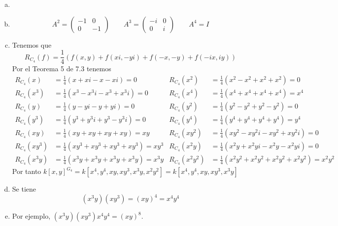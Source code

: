 \documentclass[twoside]{article}
\begin{document}
\begin{solucion}
\begin{enumerate}[a.]
\item[]
\item
\[
A^2=\begin{pmatrix}
-1 & 0\\
0 & -1
\end{pmatrix} \qquad A^3=\begin{pmatrix}
-i & 0\\
0 & i
\end{pmatrix} \qquad A^4=I
\]
\item Tenemos que
$$
R_{C_4}(f)=\frac{1}{4}(f(x,y)+f(xi,-yi)+f(-x,-y)+f(-ix,iy))
$$
Por el Teorema 5 de 7.3 tenemos
\begin{align*}
R_{C_4}(x)&=\frac{1}{4}(x+xi-x-xi) = 0  & 
R_{C_4}(x^2)&=\frac{1}{4}(x^2-x^2+x^2+x^2) = 0\\
R_{C_4}(x^3) &=\frac{1}{4}(x^3-x^3i-x^3+x^3i)=0 &
R_{C_4}(x^4) &=\frac{1}{4}(x^4+x^4+x^4+x^4)=x^4\\
R_{C_4}(y)&=\frac{1}{4}(y-yi-y+yi) = 0 &
R_{C_4}(y^2)&=\frac{1}{4}(y^2-y^2+y^2-y^2) = 0\\
R_{C_4}(y^3) &=\frac{1}{4}(y^3+y^3i+y^3-y^3i)=0&
R_{C_4}(y^4) &=\frac{1}{4}(y^4+y^4+y^4+y^4)=y^4\\
R_{C_4}(xy)&=\frac{1}{4}(xy+xy+xy +xy) = xy & 
R_{C_4}(xy^2)&=\frac{1}{4}(xy^2-xy^2i-xy^2+xy^2i) = 0\\
R_{C_4}(xy^3)&=\frac{1}{4}(xy^3+xy^3+xy^3+xy^3) = xy^3 & 
R_{C_4}(x^2y)&=\frac{1}{4}(x^2y+x^2yi -x^2y-x^2yi)=0 \\
R_{C_4}(x^3y)&=\frac{1}{4}(x^3y+x^3y+x^3y+x^3y)=x^3y &
R_{C_4}(x^2y^2)&=\frac{1}{4}(x^2y^2+x^2y^2+x^2y^2+x^2y^2)=x^2y^2
\end{align*}
Por tanto $k[x,y]^{G_4}=k[x^4,y^4,xy,xy^3,x^3y,x^2y^2]=k[x^4,y^4,xy,xy^3,x^3y]$

\item Se tiene 
$$
(x^3y)(xy^3)=(xy)^4=x^4y^4
$$
\item Por ejemplo, $(x^3y)(xy^3)x^4y^4 = (xy)^8$.
\end{enumerate}
\end{solucion}
\end{document}
